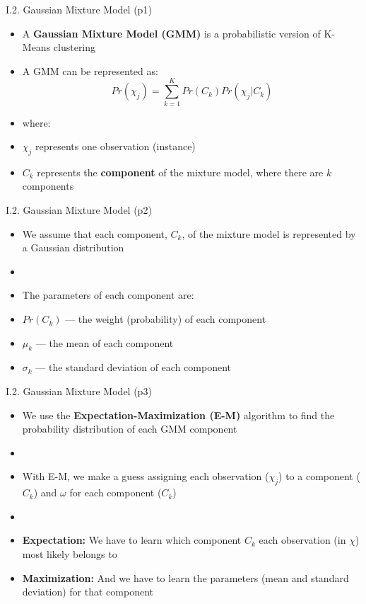 \documentclass[handout]{beamer}
\newcommand{\strong}[1]{\textbf{\color{teal} #1}}
\newcommand{\stronger}[1]{\textbf{\color{purple} #1}}
\begin{document}
\begin{frame}{I.2. Gaussian Mixture Model (p1)}
\begin{itemize}
\item A \stronger{Gaussian Mixture Model (GMM)} is a probabilistic version of K-Means clustering
\item A GMM can be represented as:
\[
Pr(\chi_j) = \sum_{k=1}^{K}{ Pr(C_k) Pr(\chi_j|C_k) }
\]
\item[] where:
\item $\chi_j$ represents one observation (instance)
\item $C_k$ represents the \textbf{component} of the mixture model, where there are $k$ components
\end{itemize}
\end{frame}
\begin{frame}{I.2. Gaussian Mixture Model (p2)}
\begin{itemize}
\item We assume that each component, $C_k$, of the mixture model is represented by a Gaussian distribution
\item[]
\item[] The parameters of each component are:
\item $Pr(C_k)$ --- the weight (probability) of each component
\item $\mu_k$ --- the mean of each component
\item $\sigma_k$ --- the standard deviation of each component
\end{itemize}
\end{frame}
\begin{frame}{I.2. Gaussian Mixture Model (p3)}
\begin{itemize}
\item We use the \stronger{Expectation-Maximization (E-M)} algorithm to find the probability distribution of each GMM component
\item[]
\item With E-M, we make a guess assigning each observation ($\chi_j$) to a component ($C_k$) and $\omega$ for each component ($C_k$)
\item[]
\item \strong{Expectation:} We have to learn which component $C_k$ each observation (in $\chi$) most likely belongs to
\item \strong{Maximization:} And we have to learn the parameters (mean and standard deviation) for that component
\end{itemize}
\end{frame}
\end{document}
